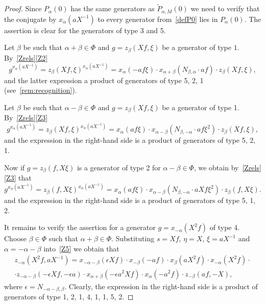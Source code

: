 \documentclass[oneside, 8pt]{amsart}
\theoremstyle{remark}
\theoremstyle{definition}
\numberwithin{lemma}{section}
\numberwithin{prop}{section}
\numberwithin{corollary}{section}
\numberwithin{externaltheorem}{section}
\numberwithin{equation}{section}
\begin{document}
\begin{proof} 
Since $P_\alpha(0)$ has the same generators as $\widetilde{P}_{\alpha, M}(0)$ we need to verify that the conjugate by $x_\alpha(aX^{-1})$ to every generator from~\cref{defP0} lies in $P_\alpha(0)$. 
The assertion is clear for the generators of type 3 and 5.

Let $\beta$ be such that $\alpha + \beta \in \Phi$ and $g = z_\beta(Xf, \xi)$ be a generator of type $1$.
By~\cref{Zrels}\eqref{Z2}
\begin{equation}\label{eq:Zconj1} g^{x_{\alpha}(aX^{-1})} = z_{\beta}(Xf, \xi) ^ {x_{\alpha}(aX^{-1})} = x_{\alpha} (- af\xi) \cdot x_{\alpha+\beta} (N_{\beta, \alpha}\cdot af) \cdot z_{\beta}(Xf, \xi), \end{equation}
and the latter expression a product of generators of type 5, 2, 1 (see~\cref{rem:recognition}).

Let $\beta$ be such that $\alpha - \beta \in \Phi$ and $g = z_\beta(Xf, \xi)$ be a generator of type 1. By~\cref{Zrels}\eqref{Z3}
\begin{equation} g^{x_{\alpha}(aX^{-1})} = z_{\beta}(Xf, \xi) ^ {x_{\alpha}(aX^{-1})} = x_{\alpha} (af\xi) \cdot x_{\alpha-\beta} (N_{\beta,-\alpha}\cdot af\xi^2) \cdot z_{\beta}(Xf, \xi), \label{eq:Zconj2} \end{equation}
and the expression in the right-hand side is a product of generators of type 5, 2, 1.

Now if $g = z_{\beta}(f, X\xi)$ is a generator of type 2 for $\alpha - \beta \in \Phi$, we obtain by~\cref{Zrels}\eqref{Z3} that
\begin{equation} g^{x_{\alpha}(aX^{-1})} = z_{\beta}(f, X\xi) ^ {x_{\alpha}(aX^{-1})} = x_{\alpha} (af\xi) \cdot x_{\alpha-\beta} (N_{\beta,-\alpha}\cdot aXf\xi^2) \cdot z_{\beta}(f, X\xi).
\end{equation} and the expression in the right-hand side is a product of generators of type 5, 1, 2.

It remains to verify the assertion for a generator $g = x_{-\alpha}(X^2f)$ of type 4.
Choose $\beta\in \Phi$ such that $\alpha+\beta \in \Phi$. 
Substituting $s = Xf$, $\eta = X$, $\xi = aX^{-1}$ and $\alpha = -\alpha - \beta$ into~\eqref{Z5} we obtain that
\begin{multline} \label{eq:Zconj3} z_{-\alpha}(X^2f, aX^{-1}) = x_{-\alpha-\beta}(\epsilon Xf) \cdot x_{-\beta}(-af) \cdot x_{\beta}(aX^2 f) \cdot x_{-\alpha}(X^2f) \cdot \\
 \cdot z_{-\alpha-\beta}(-\epsilon Xf, -\epsilon a) \cdot x_{\alpha+\beta}(-\epsilon a^2 Xf) \cdot x_{\alpha}(- a^2 f) \cdot z_{-\beta}(a f, -X), \end{multline}
where $\epsilon = N_{-\alpha-\beta,\beta}$. 
Clearly, the expression in the right-hand side is a product of generators of type 1, 2, 1, 4, 1, 1, 5, 2. \end{proof}
\end{document}
